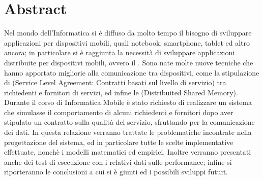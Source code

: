 \chapter*{Abstract}
Nel mondo dell'Informatica si è diffuso da molto tempo il bisogno di sviluppare applicazioni per dispositivi mobili, quali notebook, smartphone, tablet ed altro ancora; in particolare si è raggiunta la necessità di sviluppare applicazioni distribuite per dispositivi mobili, ovvero il . Sono nate molte nuove tecniche che hanno apportato migliorie alla comunicazione tra dispositivi, come la stipulazione di  (Service Level Agreement: Contratti basati sul livello di servizio) tra richiedenti e fornitori di servizi, ed infine le  (Distribuited Shared Memory). Durante il corso di Informatica Mobile è stato richiesto di realizzare un sistema che simulasse il comportamento di alcuni richiedenti e fornitori dopo aver stipulato un contratto sulla qualità del servizio, sfruttando  per la comunicazione dei dati. In questa relazione verranno trattate le problematiche incontrate nella progettazione del sistema, ed in particolare tutte le scelte implementative effettuate, nonchè i modelli matematici ed empirici. Inoltre verranno presentati anche dei test di esecuzione con i relativi dati sulle performance; infine si riporteranno le conclusioni a cui si è giunti ed i possibili sviluppi futuri.